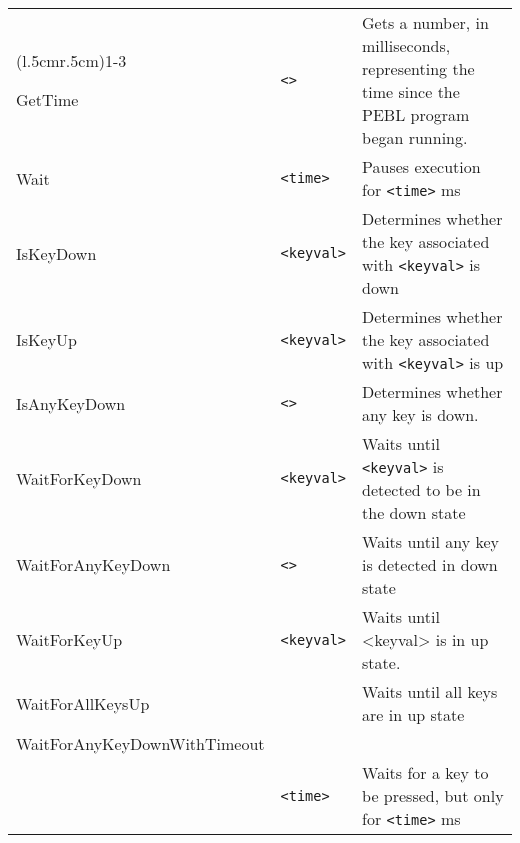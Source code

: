 \begin{longtable}{p{3cm}p{3cm}p{6cm}}
\addlinespace[0.2cm]
\midrule
\multicolumn{3}{c}{\textbf{Misc Event Functions}}\\
\cmidrule(l{.5cm}r{.5cm}){1-3}


GetTime        &\verb+<>+           &Gets a number, in milliseconds, representing the time since the PEBL program began running.\\
Wait           &\verb+<time>+       &Pauses execution for \verb+<time>+ ms \\   
IsKeyDown      &\verb+<keyval>+     &Determines whether the key associated with \verb+<keyval>+ is down \\
IsKeyUp        &\verb+<keyval>+     &Determines whether the key associated with \verb+<keyval>+ is up\\
IsAnyKeyDown   &\verb+<>+           &Determines whether any key is down.\\
WaitForKeyDown & \verb+<keyval>+     &Waits until \verb+<keyval>+ is detected to be in the down state\\
WaitForAnyKeyDown &\hspace{0.5cm} \verb+<>+       &Waits until any key is detected in down state\\
 WaitForKeyUp      &\verb+<keyval>+ &Waits until <keyval> is in up state.\\
 WaitForAllKeysUp  &           	    &Waits until all keys are in up state\\
 WaitForAnyKeyDownWithTimeout&  & \\
 & \verb+<time>+ & Waits for a key to be pressed, but only for \verb+<time>+ ms\\


\end{longtable}
